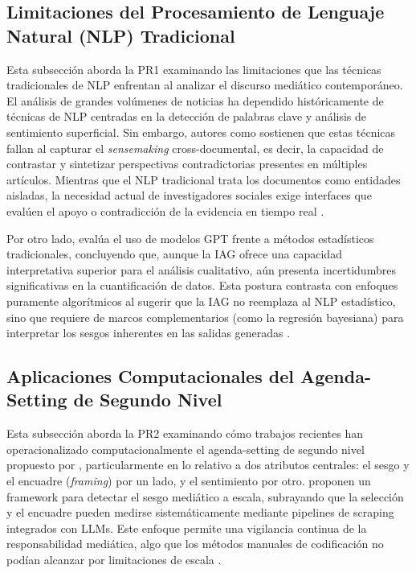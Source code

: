 \documentclass[12pt]{report}
\begin{document}
\subsection{Limitaciones del Procesamiento de Lenguaje Natural (NLP) Tradicional}
\label{sec:rsl-nlp}
Esta subsección aborda la PR1 examinando las limitaciones que las técnicas tradicionales de NLP enfrentan al analizar el discurso mediático contemporáneo. El análisis de grandes volúmenes de noticias ha dependido históricamente de técnicas de NLP centradas en la detección de palabras clave y análisis de sentimiento superficial. Sin embargo, autores como \citet{milbauer2023} sostienen que estas técnicas fallan al capturar el \textit{sensemaking} cross-documental, es decir, la capacidad de contrastar y sintetizar perspectivas contradictorias presentes en múltiples artículos. Mientras que el NLP tradicional trata los documentos como entidades aisladas, la necesidad actual de investigadores sociales exige interfaces que evalúen el apoyo o contradicción de la evidencia en tiempo real \citep{milbauer2023}.

Por otro lado, \citet{pavlyshenko2024} evalúa el uso de modelos GPT frente a métodos estadísticos tradicionales, concluyendo que, aunque la IAG ofrece una capacidad interpretativa superior para el análisis cualitativo, aún presenta incertidumbres significativas en la cuantificación de datos. Esta postura contrasta con enfoques puramente algorítmicos al sugerir que la IAG no reemplaza al NLP estadístico, sino que requiere de marcos complementarios (como la regresión bayesiana) para interpretar los sesgos inherentes en las salidas generadas \citep{pavlyshenko2024}.

\subsection{Aplicaciones Computacionales del Agenda-Setting de Segundo Nivel}
\label{sec:rsl-agenda}
Esta subsección aborda la PR2 examinando cómo trabajos recientes han operacionalizado computacionalmente el agenda-setting de segundo nivel propuesto por \citet{mccombs:1997}, particularmente en lo relativo a dos atributos centrales: el sesgo y el encuadre (\textit{framing}) por un lado, y el sentimiento por otro. \citet{haider2025} proponen un framework para detectar el sesgo mediático a escala, subrayando que la selección y el encuadre pueden medirse sistemáticamente mediante pipelines de scraping integrados con LLMs. Este enfoque permite una vigilancia continua de la responsabilidad mediática, algo que los métodos manuales de codificación no podían alcanzar por limitaciones de escala \citep{haider2025}.
\end{document}

